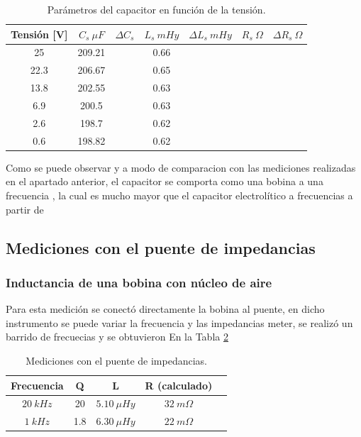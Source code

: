 \documentclass[a4paper,10pt]{article}
\begin{document}
		\begin{table}[!htp]
			\centering
			\begin{tabular}{|c|c|c|c|c|c|c|}
				\hline
				Tensión [V] & $C_s~\mu F$ & $\Delta C_s$ & 
				$L_s~mHy$  & $\Delta L_s~mHy$  & $R_s~\Omega$ & 
				$\Delta R_s~\Omega$ \\
				\hline
				25 &	209.21 &   & 0.66 & \\
				\hline
				22.3 &	206.67 &   & 0.65 & \\
				\hline
				13.8 &	202.55 &   & 0.63 & \\
				\hline
				6.9 &	200.5 &	  & 0.63 & \\
				\hline
				2.6 &	198.7 &	  & 0.62 & \\
				\hline
				0.6 &	198.82 &   & 0.62 & \\
				\hline	  
			\end{tabular}
			\caption{Parámetros del capacitor en función de la tensión.} 
			\label{tab:009}
		\end{table}	
		\indent Como se puede observar y a modo de comparacion con las 
		mediciones realizadas en el apartado anterior, el capacitor se 
		comporta como una bobina a una frecuencia ,
		la cual es  mucho mayor que el capacitor electrolítico
		a frecuencias a partir de 
	\subsection{Mediciones con el puente de impedancias}
		\subsubsection{Inductancia de una bobina con n\'ucleo de aire}
		\indent Para esta medición se conectó directamente la bobina al puente, 
		en dicho instrumento se puede variar la frecuencia y las impedancias
		meter, se realizó un barrido de frecuecias y se obtuvieron 
		En la Tabla \ref{tabPUENTEbobina}
		\begin{table}[!htp]
			\centering
			\begin{tabular}{|c|c|c|c|c|}
				\hline
				Frecuencia & Q & L  & R (calculado) \\
				\hline
				$20~kHz$& 20 & $5.10~\mu Hy$ &$ 32~m\Omega$ \\
				\hline
				$1~kHz$& 1.8 & $6.30~\mu Hy$ &$ 22~m\Omega$ \\
				\hline	  
			\end{tabular}
			\caption{Mediciones con el puente de impedancias.} 
			\label{tabPUENTEbobina}
		\end{table}	
		
\end{document}
